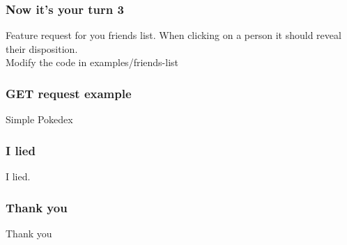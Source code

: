 \documentclass[aspectratio=1610]{beamer}
\begin{document}
\begin{frame}

\frametitle{Now it's your turn 3}
    Feature request for you friends list.
    When clicking on a person it should reveal their disposition.
    \\
    \vspace{1cm}
Modify the code in examples/friends-list
\end{frame}


\begin{frame}
\frametitle{GET request example}

\begin{center}
     \Huge Simple Pokedex
\end{center}

\end{frame}


\begin{frame}
\frametitle{I lied}

\begin{center}
     \Huge I lied.
\end{center}

\end{frame}


\begin{frame}
\frametitle{Thank you}

    \begin{center}
         \Huge Thank you
    \end{center}
\end{frame}



\end{document}
